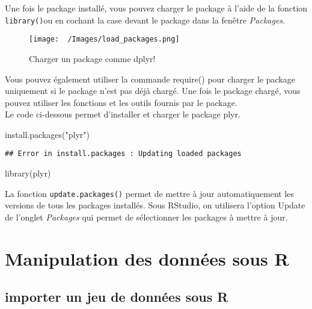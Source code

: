 \documentclass[
]{article}
\newenvironment{Shaded}{\begin{snugshade}}{\end{snugshade}}
\newcommand{\FunctionTok}[1]{\textcolor[rgb]{0.00,0.00,0.00}{#1}}
\newcommand{\NormalTok}[1]{#1}
\newcommand{\StringTok}[1]{\textcolor[rgb]{0.31,0.60,0.02}{#1}}
\begin{document}
Une fois le package installé, vous pouvez charger le package à l'aide de la fonction \texttt{library()}ou en cochant la case devant le package dans la fenêtre \emph{Packages}.

\begin{figure}
\centering
\texttt{[image: ~/Images/load\_packages.png]}
\caption{Charger un package comme dplyr!}
\end{figure}

Vous pouvez également utiliser la commande require() pour charger le package uniquement si le package n'est pas déjà chargé. Une fois le package chargé, vous pouvez utiliser les fonctions et les outils fournis par le package.\\
Le code ci-dessous permet d'installer et charger le package plyr.

\begin{Shaded}
\begin{Highlighting}[]
\FunctionTok{install.packages}\NormalTok{(}\StringTok{"plyr"}\NormalTok{)}
\end{Highlighting}
\end{Shaded}

\begin{verbatim}
## Error in install.packages : Updating loaded packages
\end{verbatim}

\begin{Shaded}
\begin{Highlighting}[]
\FunctionTok{library}\NormalTok{(plyr)}
\end{Highlighting}
\end{Shaded}

La fonction \texttt{update.packages()} permet de mettre à jour automatiquement les versions de tous les packages installés. Sous RStudio, on utilisera l'option Update de l'onglet \emph{Packages} qui permet de sélectionner les packages à mettre à jour.

\hypertarget{manipulation-des-donnuxe9es-sous-r}{%
\section{Manipulation des données sous R}\label{manipulation-des-donnuxe9es-sous-r}}

\hypertarget{importer-un-jeu-de-donnuxe9es-sous-r}{%
\subsection{importer un jeu de données sous R}\label{importer-un-jeu-de-donnuxe9es-sous-r}}
\end{document}
